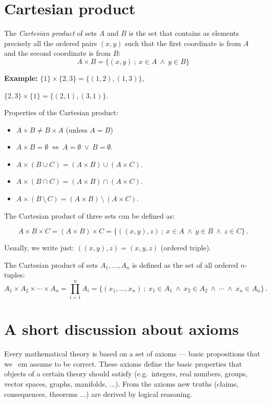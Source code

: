 \documentclass[11pt,paper=b5,footinclude,headinclude]{scrbook} %
\def\ali {{~\vee~}}
\def\inn {{~\wedge~}}
\def\brez {{\,\setminus\,}}
\def\cee {{~\Leftrightarrow~}}
\theoremstyle{remark}
\theoremstyle{definition} %
\theoremstyle{theorem} %
\begin{document}
\section{Cartesian product}

The {\em Cartesian product} of sets $A$ and $B$ is the set that contains as elements precisely all the ordered pairs $(x,y)$ such that
 the first coordinate is from $A$ and the second coordinate is from $B$:
 $$A\times B = \{(x,y)~;~x\in A\inn y\in B\}$$

\textbf{ Example:} $\{1\}\times \{2,3\} = \{(1,2),(1,3)\}$,

$\{2,3\}\times \{1\} = \{(2,1),(3,1)\}$.

\bigskip
Properties of the Cartesian product:
\begin{itemize}
  \item $A\times B\neq B\times A$ (unless $A = B$)
  \item $A\times B = \emptyset \cee A= \emptyset \ali B = \emptyset$.
  \item $A\times (B\cup C) = (A\times B) \cup (A\times C)$.
  \item $A\times (B\cap C) = (A\times B) \cap (A\times C)$.
  \item $A\times (B\brez C) = (A\times B) \brez (A\times C)$.
\end{itemize}

The Cartesian product of three sets can be defined as:

$$A\times B\times C = (A\times B)\times C= \{((x,y),z)~;~x\in A \inn y\in B\inn z\in C\}\,.$$

Usually, we write just: $((x,y),z) = (x,y,z)$ (ordered triple).

\bigskip
The Cartesian product of sets $A_1,\ldots, A_n$ is defined as the set of all ordered
$n$-tuples:
$$A_1\times A_2\times\cdots \times A_n = \prod_{i = 1}^n A_i = \{(x_1,\ldots, x_n)~;~x_1\in A_1\inn x_2\in A_2\inn\cdots \inn x_n\in A_n\}\,.$$


\section*{A short discussion about axioms}

Every mathematical theory is based on a set of axioms --- basic propositions that we {\ em assume} to be correct.
These axioms define the basic properties that objects of a certain theory should satisfy (e.g.~integers, real numbers, groups, vector spaces, graphs, manifolds, ...). From the axioms new truths (claims, consequences, theorems ...) are derived by logical reasoning.
\end{document}
